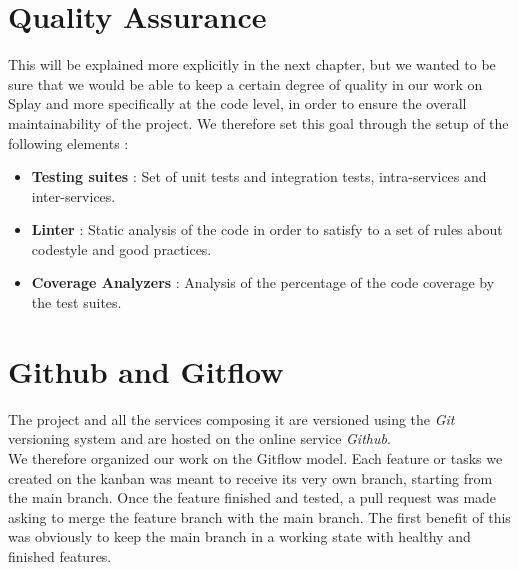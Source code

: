 \documentclass{eplmastersthesis}
\begin{document}
      \section{Quality Assurance}

        This will be explained more explicitly in the next chapter, but we
        wanted to be sure that we would be able to keep a certain degree of
        quality in our work on Splay and more specifically at the code level,
        in order to ensure the overall maintainability of the project. We
        therefore set this goal through the setup of the following elements :\\

        \begin{itemize}
          \item \textbf{Testing suites} : Set of unit tests and integration
          tests, intra-services and inter-services.
          \item \textbf{Linter} : Static analysis of the code in order to
          satisfy to a set of rules about codestyle and good practices.
          \item \textbf{Coverage Analyzers} : Analysis of the percentage of
          the code coverage by the test suites.
        \end{itemize}

      \section{Github and Gitflow}

        The project and all the services composing it are versioned using the
        \textit{Git} versioning system and are hosted on the online service
        \textit{Github}.\\
        We therefore organized our work on the Gitflow model. Each feature or
        tasks we created on the kanban was meant to receive its very own
        branch, starting from the main branch.
        Once the feature finished and tested, a pull request was made asking
        to merge the feature branch with the main branch.
        The first benefit of this was obviously to keep the main branch in
        a working state with healthy and finished features.\\
\end{document}
